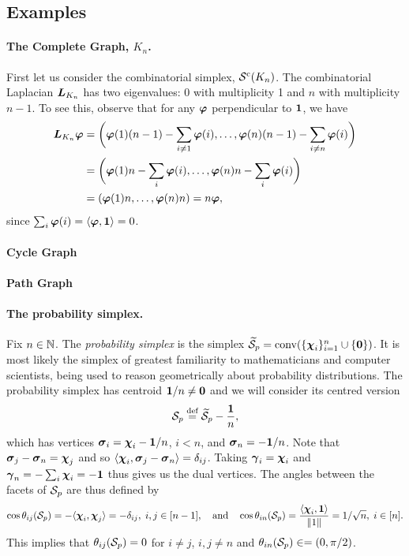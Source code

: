 \subsection{Examples}


\paragraph{The Complete Graph, $K_n$.}
First let us consider the combinatorial simplex, $\mathcal{S}^{\textnormal{c}}(K_n)$.  The combinatorial Laplacian $\vb*{L}_{K_n}$ has two eigenvalues: 0 with multiplicity 1 and $n$ with multiplicity $n-1$. To see this, observe that for any $\vb*{\varphi}$ perpendicular to $\vb{1}$, we have 
\begin{align*}
\vb*{L}_{K_n}\vb*{\varphi} &= \bigg(\vb*{\varphi}(1)(n-1)-\sum_{i\neq 1}\vb*{\varphi}(i),\dots,\vb*{\varphi}(n)(n-1)-\sum_{i\neq n}\vb*{\varphi}(i)\bigg) \\
&= \bigg(\vb*{\varphi}(1)n - \sum_i \vb*{\varphi}(i), \dots,\vb*{\varphi}(n)n - \sum_i \vb*{\varphi}(i)\bigg) \\
&= (\vb*{\varphi}(1)n,\dots,\vb*{\varphi}(n)n) = n\vb*{\varphi},
\end{align*}
since $\sum_i\vb*{\varphi}(i)=\langle \vb*{\varphi},\vb{1}\rangle =0$. 

\paragraph{Cycle Graph}

\paragraph{Path Graph}

\paragraph{The probability simplex.} 
Fix  $n\in\mathbb{N}$. The \emph{probability simplex} is the simplex $\widetilde{\mathcal{S}}_p=\textnormal{conv}(\{\boldsymbol{\chi}_i\}_{i=1}^n \cup \{\vb{0}\})$. It is most likely the simplex of greatest familiarity to mathematicians and computer scientists, being used to reason geometrically about probability distributions. The probability simplex has centroid $\vb{1}/n\neq\vb{0}$ and we will consider its centred version 
\[\mathcal{S}_p \overset{\text{def}}{=} \widetilde{\mathcal{S}}_p -  \frac{\vb{1}}{n},\]
which has vertices  $\vb*{\sigma}_i = \boldsymbol{\chi}_i - \vb{1}/n$, $i<n$, and $\vb*{\sigma}_n = -\vb{1}/n$. Note that $\vb*{\sigma}_j-\vb*{\sigma}_n = \boldsymbol{\chi}_j$ and so 
$\langle \boldsymbol{\chi}_i, \vb*{\sigma}_j-\vb*{\sigma}_n\rangle = \delta_{ij}$. Taking  $\vb*{\gamma}_i = \boldsymbol{\chi}_i$ and $\vb*{\gamma}_n = -\sum_i \boldsymbol{\chi}_i = -\vb{1}$ thus gives us the dual vertices. The  angles between the facets of $\mathcal{S}_p$ are thus defined by 
\begin{equation*}
\cos\theta_{ij}(\mathcal{S}_p) = - \langle \boldsymbol{\chi}_i,\boldsymbol{\chi}_j\rangle = -\delta_{ij}, \; i,j\in[n-1],  \quad \text{and}\quad \cos\theta_{in}(\mathcal{S}_p) = \frac{\langle \boldsymbol{\chi}_i,\vb{1}\rangle}{\norm{1}} = 1/\sqrt{n}, \;i\in[n].
\end{equation*}
This implies  that $\theta_{ij}(\mathcal{S}_p) = 0$ for $i\neq j$, $i,j\neq n$ and $\theta_{in}(\mathcal{S}_p) \in =(0,\pi/2)$. 

